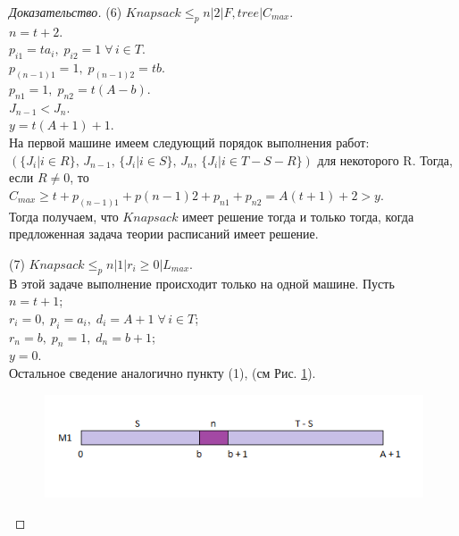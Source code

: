 \documentclass[a4paper,12pt]{article}
\theoremstyle{plain} %
\theoremstyle{definition} %
\theoremstyle{remark} %
\begin{document}
\begin{proof}[Доказательство]
	\par\bigskip
	(6) $Knapsack \le_p n|2|F, tree|C_{max}$.\\
	$n = t + 2$.\\
	$p_{i1} = ta_i, \; p_{i2} = 1 \; \forall \, i \in T$.\\
	$p_{(n-1)1} = 1, \; p_{(n-1)2} = tb$.\\
	$p_{n1} = 1, \; p_{n2} = t(A - b)$.\\
	$J_{n - 1} < J_n$.\\
	$y = t(A + 1) + 1$.\\
	На первой машине имеем следующий порядок выполнения работ:\\
	$(\{J_i|i \in R\}, \, J_{n - 1}, \, \{J_i|i \in S\}, \, J_n, \, \{J_i|i \in T - S - R\})$ для некоторого R. Тогда, если $R \ne 0$, то\\
	$C_{max} \ge t + p_{(n - 1)1} + p{(n - 1)2} + p_{n1} + p_{n2} = A(t + 1) + 2 > y$.\\
	Тогда получаем, что $Knapsack$ имеет решение тогда и только тогда, когда предложенная задача теории расписаний имеет решение.
	
	\par\bigskip
	(7) $Knapsack \le_p n|1|r_i \ge 0|L_{max}$.\\
	В этой задаче выполнение происходит только на одной машине. Пусть\\
	$n = t + 1$;\\
	$r_i = 0, \; p_i = a_i, \; d_i = A + 1 \; \forall \, i \in T$;\\
	$r_n = b, \; p_n = 1, \; d_n = b + 1$;\\
	$y = 0$.\\
	Остальное сведение аналогично пункту (1), (см Рис. \ref{fig_4}).
	\begin{figure}[h!]
		\begin{center}
			\includegraphics[scale=0.65]{pic_4.png}
			\caption[]{}
			\label{fig_4}
		\end{center}
	\end{figure}
	

\end{proof}
\end{document}
